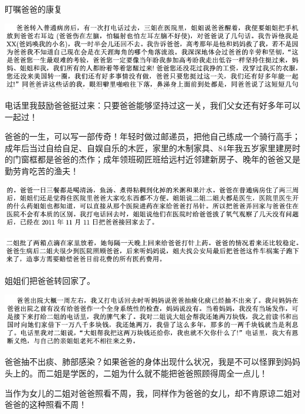 \documentclass[9pt, b5paper]{article}
\begin{document}
盯嘱爸爸的康复

\begin{center}
\includegraphics[width=.9\linewidth]{./pic/backups_plans_20210416_161542.png}
\end{center}

电话里我鼓励爸爸挺过来：只要爸爸能够坚持过这一关，我们父女还有好多年可以一起过！

爸爸的一生，可以写一部传奇！年轻时做过邮递员，把他自己练成一个骑行高手；成年后当过自给自足、自娱自乐的木匠，家里的木制家具、84年我五岁家里建房时的门窗框都是爸爸的杰作；成年领班砌匠班给远村近邻建新房子、晚年的爸爸又是勤劳肯吃苦的渔夫！  

\begin{center}
\includegraphics[width=.9\linewidth]{./pic/backups_plans_20210416_162007.png}
\end{center}

\begin{center}
\includegraphics[width=.9\linewidth]{./pic/backups_plans_20210416_162127.png}
\end{center}

姐姐们把爸爸转回家了。 

\begin{center}
\includegraphics[width=.9\linewidth]{./pic/backups_plans_20210416_162200.png}
\end{center}

爸爸抽不出痰、肺部感染？如果爸爸的身体出现什么状况，我是不可以怪罪到妈妈头上的。而二姐是学医的，二姐为什么就不能把爸爸照顾得周全一点儿！

当作为女儿的二姐对爸爸照看不周，我，同样作为爸爸的女儿，却不肯原谅二姐对爸爸的这种照看不周！
\end{document}
